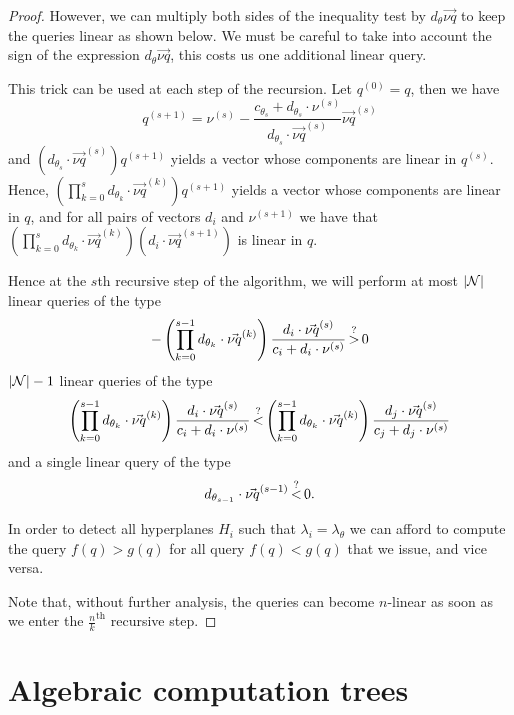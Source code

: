 \begin{proof}
However, we can multiply both sides of the inequality test by \(d_\theta
\vec{\nu q}\) to keep the queries linear as shown below. We must be careful to
take into account the sign of the expression \(d_\theta \vec{\nu q}\), this
costs us one additional linear query.

This trick can be used at each step of the recursion. Let \(q^{(0)} = q\),
then we have
$$
	q^{(s+1)} = \nu^{(s)} - \frac{c_{\theta_{s}} + d_{\theta_{s}} \cdot
	\nu^{(s)}}{d_{\theta_{s}} \cdot \vec{\nu q}^{(s)}}\vec{\nu q}^{(s)}
$$
and \( (d_{\theta_{s}}\cdot \vec{\nu q}^{(s)}) q^{(s+1)}\) yields a vector
whose components are linear in \(q^{(s)}\).
Hence,
\( (\prod_{k=0}^{s} d_{\theta_{k}} \cdot \vec{\nu q}^{(k)})
 q^{(s+1)}\) yields a vector
whose components are linear in \(q\),
and for all pairs of vectors \(d_i\) and \(\nu^{(s+1)}\)
we have that \( (\prod_{k=0}^{s} d_{\theta_{k}} \cdot \vec{\nu q}^{(k)}) (d_i
\cdot \vec{\nu q}^{(s+1)})\) is linear in \(q\).

Hence at the $s$th recursive step of the algorithm, we will perform
at most \(|{\mathcal{N}}|\) linear queries of the type
$$
	-\left(\prod_{k=0}^{s-1} d_{\theta_{k}} \cdot \vec{\nu q}^{(k)}\right)
\frac{d_i \cdot \vec{\nu q}^{(s)}}{c_i + d_i \cdot
	\nu^{(s)}} \mathop{>}^{?} 0
$$
\(|{\mathcal{N}}| - 1\) linear queries of the type
$$
	\left(\prod_{k=0}^{s-1} d_{\theta_{k}} \cdot \vec{\nu q}^{(k)}\right)
	\frac{d_i \cdot \vec{\nu q}^{(s)}}{c_i + d_i \cdot \nu^{(s)}}
\mathop{<}^{?}
\left(\prod_{k=0}^{s-1} d_{\theta_{k}} \cdot \vec{\nu q}^{(k)}\right)
\frac{d_j \cdot \vec{\nu q}^{(s)}}{c_j + d_j \cdot \nu^{(s)}}
$$
and a single linear query of the type
$$
	d_{\theta_{s-1}} \cdot \vec{\nu q}^{(s-1)} \mathop{<}^{?} 0.
$$

In order to detect all hyperplanes \(H_i\) such that \(\lambda_i =
\lambda_\theta\) we can afford to compute the query $f(q) > g(q)$ for all query
$f(q) < g(q)$ that we issue, and vice versa.

Note that, without further analysis, the queries can become \(n\)-linear as
soon as we enter the \(\frac{n}{k}^{\text{th}}\) recursive step.
\end{proof}

\section{Algebraic computation trees}
\label{app:act}

